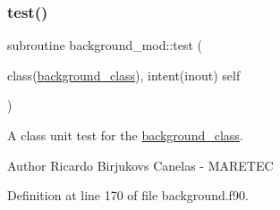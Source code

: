 \subsubsection{\texorpdfstring{test()}{test()}}
{\footnotesize\ttfamily subroutine background\+\_\+mod\+::test (\begin{DoxyParamCaption}\item[{class(\mbox{\hyperlink{structbackground__mod_1_1background__class}{background\+\_\+class}}), intent(inout)}]{self }\end{DoxyParamCaption})\hspace{0.3cm}{\ttfamily [private]}}



A class \textquotesingle{}unit\textquotesingle{} test for the \mbox{\hyperlink{structbackground__mod_1_1background__class}{background\+\_\+class}}. 

\begin{DoxyAuthor}{Author}
Ricardo Birjukovs Canelas -\/ M\+A\+R\+E\+T\+EC 
\end{DoxyAuthor}


Definition at line 170 of file background.\+f90.


